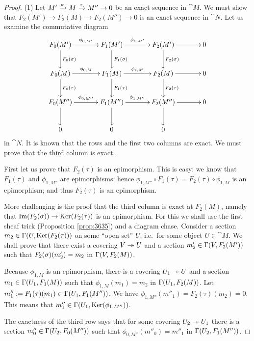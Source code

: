 \begin{proof} \mbox{}

\smallskip \noindent
(1) Let 
$M' \xrightarrow{\sigma} M \xrightarrow{\tau} M'' \to 0$ 
be an exact sequence in $\cat{M}$. We must show that 
$F_2(M') \to F_2(M) \to F_2(M'') \to 0$ 
is an exact sequence in $\cat{N}$. Let us examine the commutative diagram 
\begin{equation} \label{eqn:3628}
\UseTips \xymatrix @C=8ex @R=6ex {
F_0(M')
\ar[r]^{\phi_{0, M'}}
\ar[d]^{F_0(\si)}
&
F_1(M')
\ar[d]^{F_1(\si)}
\ar[r]^{\phi_{1, M'}}
&
F_2(M')
\ar[r]
\ar[d]^{F_2(\si)}
&
0
\\
F_0(M)
\ar[r]^{\phi_{0, M}}
\ar[d]^{F_0(\tau)}
&
F_1(M)
\ar[r]^{\phi_{1, M}}
\ar[d]^{F_1(\tau)}
&
F_2(M)
\ar[r]
\ar[d]^{F_2(\tau)}
&
0
\\
F_0(M'')
\ar[r]^{\phi_{0, M''}}
\ar[d]
&
F_1(M'')
\ar[r]^{\phi_{1, M''}}
\ar[d]
&
F_2(M'')
\ar[r]
\ar[d]
&
0
\\
0
&
0
&
0
}
\end{equation}
in $\cat{N}$. It is known that the rows and the first two columns are exact. We 
must prove that the third column is exact. 

First let us prove that $F_2(\tau)$ is an epimorphism. This is easy: 
we know that $F_1(\tau)$ and $\phi_{1, M''}$ are epimorphisms; hence 
$\phi_{1, M''} \circ F_1(\tau) = F_2(\tau) \circ \phi_{1, M}$
is an epimorphism; and thus $F_2(\tau)$ is an epimorphism.

More challenging is the proof that the third column is exact at $F_2(M)$, 
namely that 
$\operatorname{Im}(F_2(\sigma)) \to \operatorname{Ker}(F_2(\tau))$
is an epimorphism. For this we shall use the first sheaf trick (Proposition 
\ref{prop:3635}) and a diagram chase. Consider a section 
$m_2 \in \Gamma(U, \operatorname{Ker}(F_2(\tau)))$
on some ``open set'' $U$, i.e.\ for some object $U \in \cat{M}$. 
We shall prove that there exist a covering $V \twoheadrightarrow U$ and a section 
$m'_2 \in \Gamma(V, F_2(M'))$ such that 
$F_2(\sigma)(m'_2) = m_2$ 
in $\Gamma(V, F_2(M))$. 

Because $\phi_{1, M}$ is an epimorphism, there is a covering 
$U_1 \twoheadrightarrow U$ and a section 
$m_1 \in \Gamma(U_1, F_1(M))$
such that 
$\phi_{1, M}(m_1) = m_2$ in $\Gamma(U_1, F_2(M))$. 
Let
$m''_1 := F_1(\tau)(m_1)  \in \Gamma(U_1, F_1(M''))$.
We have 
$\phi_{1,M''}(m''_1) = F_2(\tau)(m_2) = 0$. 
This means that 
$m''_1 \in \Gamma(U_1, \operatorname{Ker}(\phi_{1,M''}))$.

The exactness of the third row says that for some covering 
$U_2 \twoheadrightarrow U_1$ there is a section  
$m''_0 \in \Gamma(U_2, F_0(M''))$
such that 
$\phi_{0, M''}(m''_0 ) = m''_1$ in $\Gamma(U_2, F_1(M''))$.


\end{proof}
